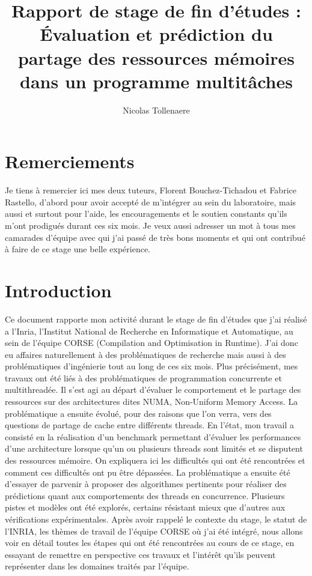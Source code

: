 \documentclass{report}
\author{Nicolas Tollenaere}
\title{Rapport de stage de fin d'études : Évaluation et prédiction du partage des ressources mémoires
dans un programme multitâches}
\begin{document}
\maketitle
\tableofcontents

\chapter{Remerciements}
Je tiens à remercier ici mes deux tuteurs, Florent Bouchez-Tichadou et Fabrice Rastello, d'abord pour avoir 
accepté de m'intégrer au sein du laboratoire, mais aussi et surtout pour l'aide, les encouragements et le
soutien constants qu'ils m'ont prodigués durant ces six mois. Je veux aussi adresser un mot à tous mes 
camarades d'équipe avec qui j'ai passé de très bons moments et qui ont contribué à faire de ce stage
une belle expérience.


\chapter{Introduction}
Ce document rapporte mon activité durant le stage de fin d'études que j'ai 
réalisé a l'Inria, l'Institut National de Recherche en Informatique et
Automatique, au sein de l'équipe CORSE (Compilation and Optimisation in Runtime).
J'ai donc eu affaires naturellement à des problématiques de recherche mais aussi à
des problématiques d'ingénierie tout au long de ces six mois. Plus précisément, mes travaux ont été
liés à des problématiques de programmation concurrente et multithreadée. Il s'est agi au départ d'évaluer
le comportement et le partage des ressources sur des architectures dites NUMA, Non-Uniform Memory Access. 
La problématique a ensuite évolué, pour des raisons que l'on verra, vers des questions de partage de cache
entre différents threads.
En l'état, mon travail a consisté en la réalisation d'un benchmark permettant d'évaluer les performances
d'une architecture lorsque qu'un ou plusieurs threads sont limités et se disputent des ressources mémoire.
On expliquera ici les difficultés qui ont été rencontrées et comment ces difficultés ont pu être dépassées.
La problématique a ensuite été d'essayer de parvenir à proposer des algorithmes pertinents pour réaliser 
des prédictions quant aux comportements des threads en concurrence. 
Plusieurs pistes et modèles ont été explorés, certains résistant mieux que d'autres aux vérifications 
expérimentales.
Après avoir rappelé le contexte du stage, le statut de l'INRIA, les thèmes de travail de l'équipe CORSE où
j'ai été intégré, nous allons voir en détail toutes les étapes qui ont été rencontrées au cours de ce stage, 
en essayant de remettre en perspective ces travaux et l'intérêt qu'ils peuvent représenter dans les 
domaines traités par l'équipe.
\end{document}
